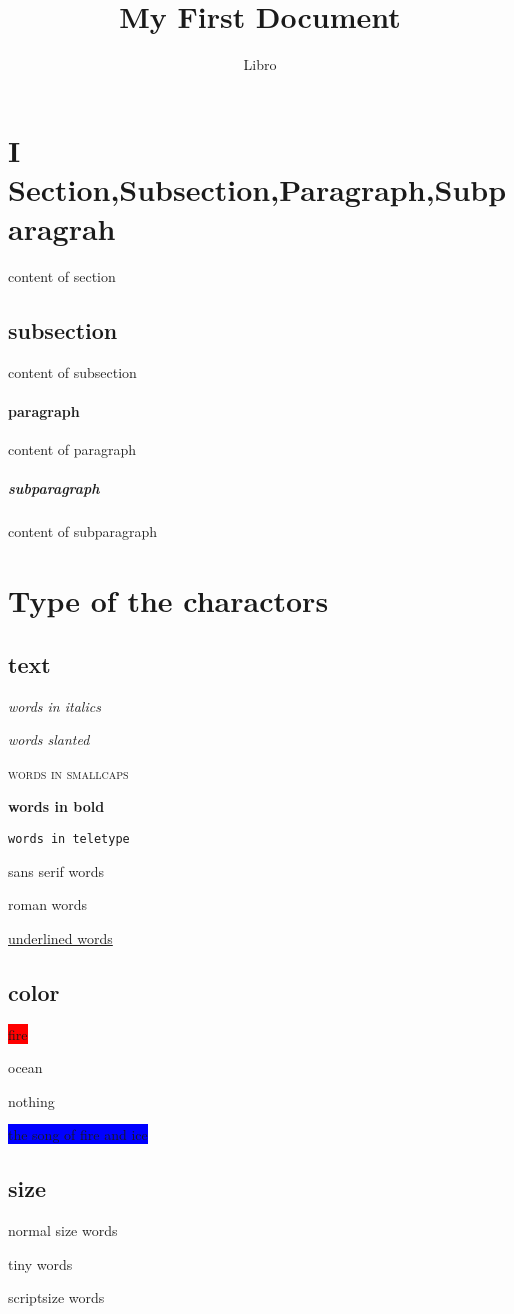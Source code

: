 \documentclass[a4paper,12pt]{article}
\begin{document}
	\title{My First Document}
	\author{Libro}
	\date{\todat}
	\maketitle
\section{I Section,Subsection,Paragraph,Subparagrah}
	content of section
	\subsection{subsection}
		content of subsection
	\paragraph{paragraph}
		content of paragraph
	\subparagraph{subparagraph}
		content of subparagraph
	\section{Type of the charactors}
	\subsection{text}
		\textit{words in italics}
		
		\textsl{words slanted}
		
		\textsc{words in smallcaps}
		
		\textbf{words in bold}
		
		\texttt{words in teletype}
		
		\textsf{sans serif words}
		
		\textrm{roman words}
		
		\underline{underlined words}
	
	\subsection{color}
		\colorbox{red}{fire}
		
		{\color{blue}ocean}
		
		nothing
		
		\colorbox{blue}{\color{red} the song of fire and ice}
	\subsection{size}
		normal size words
		
		{\tiny tiny words}
		
		{\scriptsize scriptsize words}
		
\end{document}
